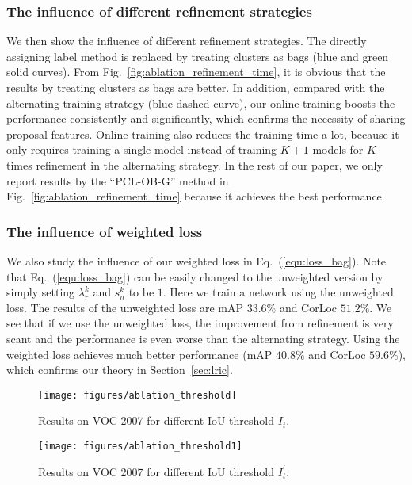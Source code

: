 \documentclass[10pt,journal,compsoc]{IEEEtran}
\def\methodname{PCL}
\begin{document}
\subsubsection{The influence of different refinement strategies}

We then show the influence of different refinement strategies.
The directly assigning label method is replaced by treating clusters as bags ({blue and green solid curves}).
From Fig.~\ref{fig:ablation_refinement_time}, it is obvious that the results by treating clusters as bags are better.
In addition, compared with the alternating training strategy (blue dashed curve),
our online training boosts the performance consistently and significantly, which confirms the necessity of sharing proposal features.
Online training also reduces the training time a lot,
because it only requires training a single model instead of training $K+1$ models for $K$ times refinement in the alternating strategy.
In the rest of our paper,
we only report results by the ``\methodname-OB-G'' method in Fig.~\ref{fig:ablation_refinement_time}
because it achieves the best performance.



\subsubsection{The influence of weighted loss}
\label{sec:influence_wl}

We also study the influence of our weighted loss in Eq.~(\ref{equ:loss_bag}).
Note that Eq.~(\ref{equ:loss_bag}) can be easily changed to the unweighted version by simply setting $\lambda^{k}_{r}$ and $s^{k}_{n}$ to be $1$.
Here we train a network using the unweighted loss.
The results of the unweighted loss are mAP $33.6\%$ and CorLoc $51.2\%$.
We see that if we use the unweighted loss, the improvement from refinement is very scant and the performance is even worse than the alternating strategy.
Using the weighted loss achieves much better performance (mAP $40.8\%$ and CorLoc $59.6\%$),
which confirms our theory in Section~\ref{sec:lric}.


\begin{figure}[t]
\begin{minipage}[t]{0.485\linewidth}
    \begin{center}
        \texttt{[image: figures/ablation\_threshold]}
    \end{center}
    \caption{Results on VOC 2007 for different IoU threshold $I_{t}$.}
    \label{fig:ablation_threshold}
\end{minipage}\hfill
\begin{minipage}[t]{0.485\linewidth}
    \begin{center}
        \texttt{[image: figures/ablation\_threshold1]}
    \end{center}
    \caption{Results on VOC 2007 for different IoU threshold $I^{\prime}_{t}$.}
    \label{fig:ablation_threshold1}
\end{minipage}
\end{figure}
\end{document}
